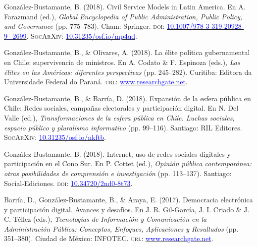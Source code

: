 \begin{publications}

\begin{benumerate}{12}

\item{\small González-Bustamante, B. (2018). Civil Service Models in Latin America. En A. Farazmand (ed.), {\itshape Global Encyclopedia of Public Administration, Public Policy, and Governance}  (pp. 775--783). Cham: Springer. {\scshape doi}: \href{https://doi.org/10.1007/978-3-319-20928-9\_2699}{\textcolor{blue}{10.1007/978-3-319-20928-9\_2699}}. {\scshape \footnotesize SocArXiv:} \href{https://doi.org/10.31235/osf.io/mp4qd}{\textcolor{blue}{10.31235/osf.io/mp4qd}}.}\vspace{1mm}

\item{\small González-Bustamante, B., \& Olivares, A. (2018). La élite política gubernamental en Chile: supervivencia de ministros. En A. Codato \& F. Espinoza (eds.), {\itshape Las élites en las Américas: diferentes perspectivas} (pp. 245--282). Curitiba: Editora da Universidade Federal do Paraná. {\scshape url:} \href{https://www.researchgate.net/publication/325699783_Elites_en_las_Americas_diferentes_perspectivas_Elites_in_the_Americas_Different_Perspectives}{\textcolor{blue}{www.researchgate.net}}.}\vspace{1mm}

\item{\small González-Bustamante, B., \& Barría, D. (2018). Expansión de la esfera pública en Chile: Redes sociales, campañas electorales y participación digital. En N. Del Valle (ed.), {\itshape Transformaciones de la esfera pública en Chile. Luchas sociales, espacio público y pluralismo informativo} (pp. 99--116). Santiago: RIL Editores. {\scshape \footnotesize SocArXiv:} \href{https://doi.org/10.31235/osf.io/nkftb}{\textcolor{blue}{10.31235/osf.io/nkftb}}.}\vspace{1mm}

\item{\small González-Bustamante, B. (2018). Internet, uso de redes sociales digitales y participación en el Cono Sur. En P. Cottet (ed.), {\itshape Opinión pública contemporánea: otras posibilidades de comprensión e investigación} (pp. 113--137). Santiago: Social-Ediciones. {\scshape doi:} \href{https://doi.org/10.34720/2nd0-8t73}{\textcolor{blue}{10.34720/2nd0-8t73}}.}\vspace{1mm}

\item{\small Barría, D., González-Bustamante, B., \& Araya, E. (2017). Democracia electrónica y participación digital. Avances y desafíos. En J. R. Gil-García, J. I. Criado \&  J. C. Téllez (eds.), {\itshape Tecnologías de Información y Comunicación en la Administración P\'ublica: Conceptos, Enfoques, Aplicaciones y Resultados} (pp. 351--380). Ciudad de México: INFOTEC. {\scshape url:} \href{https://www.researchgate.net/publication/321980289_Democracia_electronica_y_participacion_digital_Avances_y_desafios}{\textcolor{blue}{www.researchgate.net}}.}\vspace{1mm}


\end{benumerate}
\end{publications}
